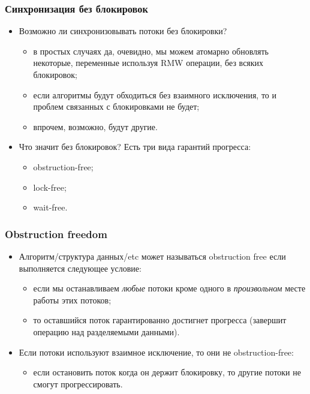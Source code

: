 \begin{frame}
\frametitle{Синхронизация без блокировок}
\begin{itemize}
  \item Возможно ли синхронизовывать потоки без блокировки?
  \begin{itemize}
    \item в простых случаях да, очевидно, мы можем атомарно обновлять некоторые,
    переменные используя RMW операции, без всяких блокировок;
    \item если алгоритмы будут обходиться без взаимного исключения, то и проблем
    связанных с блокировками не будет;
    \item впрочем, возможно, будут другие.
  \end{itemize}
  \item Что значит без блокировок? Есть три вида гарантий прогресса:
  \begin{itemize}
    \item obstruction-free;
    \item lock-free;
    \item wait-free.
  \end{itemize}
\end{itemize}
\end{frame}

\begin{frame}
\frametitle{Obstruction freedom}
\begin{itemize}
  \item Алгоритм/структура данных/etc может называться obstruction free если
  выполняется следующее условие:
  \begin{itemize}
    \item если мы останавливаем \emph{любые} потоки кроме одного в
    \emph{произвольном} месте работы этих потоков;
    \item то оставшийся поток гарантированно достигнет прогресса (завершит
    операцию над разделяемыми данными).
  \end{itemize}
  \item Если потоки используют взаимное исключение, то они не obstruction-free:
  \begin{itemize}
    \item если остановить поток когда он держит блокировку, то другие потоки не
    смогут прогрессировать.
  \end{itemize}
\end{itemize}
\end{frame}

